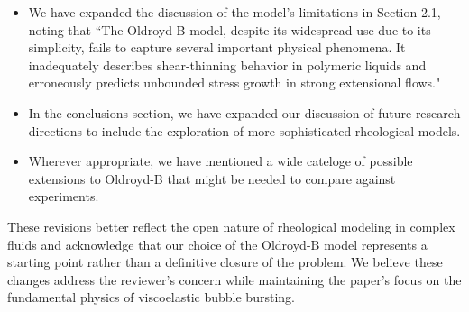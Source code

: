 \documentclass[]{article}
\newcommand{\AKD}[1]{{\textcolor{magenta}{#1}}}
\newcommand{\vsy}[1]{\todo[color=orange, bordercolor=none, textcolor=white]{Vatsal}\textcolor{orange}{#1}}
\begin{document}
\begin{enumerate}
\begin{enumerate}
\begin{itemize}
            \item We have expanded the discussion of the model's limitations in Section 2.1, noting that ``The Oldroyd-B model, despite its widespread use due to its simplicity, fails to capture several important physical phenomena. It inadequately describes shear-thinning behavior in polymeric liquids and erroneously predicts unbounded stress growth in strong extensional flows."
            \item In the conclusions section, we have expanded our discussion of future research directions to include the exploration of more sophisticated rheological models.
            \item Wherever appropriate, we have mentioned a wide cateloge of possible extensions to Oldroyd-B that might be needed to compare against experiments.
        \end{itemize}

        These revisions better reflect the open nature of rheological modeling in complex fluids and acknowledge that our choice of the Oldroyd-B model represents a starting point rather than a definitive closure of the problem. We believe these changes address the reviewer's concern while maintaining the paper's focus on the fundamental physics of viscoelastic bubble bursting.




    \end{enumerate}


\end{enumerate}
\end{document}
